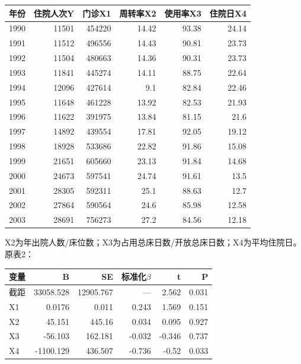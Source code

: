 \begin{center}\small\setlength{\tabcolsep}{3.5pt}\renewcommand{\arraystretch}{1.18}\begin{tabular}{@{}lrrrrr@{}}
\toprule
年份 & 住院人次Y & 门诊X1 & 周转率X2 & 使用率X3 & 住院日X4 \\
\midrule

1990 & 11501 & 454220 & 14.42 & 93.38 & 24.14 \\
1991 & 11512 & 496556 & 14.43 & 90.81 & 23.73 \\
1992 & 11504 & 480663 & 14.36 & 90.31 & 23.73 \\
1993 & 11841 & 445274 & 14.11 & 88.75 & 22.64 \\
1994 & 12096 & 427614 & 9.1 & 82.84 & 22.46 \\
1995 & 11648 & 461228 & 13.92 & 82.53 & 21.93 \\
1996 & 11622 & 391975 & 13.84 & 81.15 & 21.6 \\
1997 & 14892 & 439554 & 17.81 & 92.05 & 19.12 \\
1998 & 18928 & 533686 & 22.82 & 91.86 & 15.08 \\
1999 & 21651 & 605660 & 23.13 & 91.84 & 14.68 \\
2000 & 24673 & 597541 & 24.74 & 91.61 & 13.5 \\
2001 & 28305 & 592311 & 25.1 & 88.63 & 12.7 \\
2002 & 27864 & 590564 & 24.6 & 85.98 & 12.58 \\
2003 & 28691 & 756273 & 27.2 & 84.56 & 12.18 \\
\bottomrule\end{tabular}\end{center}

X2为年出院人数/床位数；X3为占用总床日数/开放总床日数；X4为平均住院日。原表2：

\begin{center}\small\setlength{\tabcolsep}{3.5pt}\renewcommand{\arraystretch}{1.18}\begin{tabular}{@{}lrrrrr@{}}
\toprule
变量 & B & SE & 标准化\(\beta\) & t & P \\
\midrule

截距 & 33058.528 & 12905.767 & --- & 2.562 & 0.031 \\
X1 & 0.0176 & 0.011 & 0.243 & 1.569 & 0.151 \\
X2 & 45.151 & 445.16 & 0.034 & 0.095 & 0.927 \\
X3 & -56.103 & 162.181 & -0.032 & -0.346 & 0.737 \\
X4 & -1100.129 & 436.507 & -0.736 & -0.52 & 0.033 \\
\bottomrule\end{tabular}\end{center}

